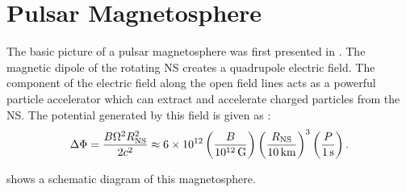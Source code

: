 \section{Pulsar Magnetosphere}

The basic picture of a pulsar magnetosphere was first presented in
\cite{goldreich_1969_pulsar-electrodynamics}.  The magnetic dipole
of the rotating \ac{NS} creates a quadrupole electric field.
The component of the electric field along the open field lines acts as
a powerful particle accelerator which can extract and accelerate charged
particles from the \ac{NS}. The potential generated
by this field is given as \citep{goldreich_1969_pulsar-electrodynamics}:
\begin{equation}
\Delta \Phi = \frac{B \Omega^2 R_\text{NS}^2}{2c^2}
\approx 6\times 10^{12} 
\left(\frac{B}{10^{12}\,\text{G}}\right)
\left(\frac{R_\text{NS}}{10\,\text{km}}\right)^3
\left(\frac{P}{1\,\text{s}}\right).
\end{equation}

 shows a schematic diagram of this
magnetosphere.


